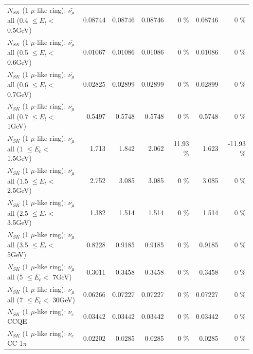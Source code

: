 \begin{table}
\begin{tabular}{| l | r | r | r  r | r  r |}
 $N_{SK}$ (1 $\mu$-like ring): $\bar{\nu_{\mu}}$ all (0.4 $\leq E_{t} <$ 0.5GeV) &         0.08744 &         0.08746 &         0.08746 &        0 \%  &         0.08746 &        0 \%  \\ 
 $N_{SK}$ (1 $\mu$-like ring): $\bar{\nu_{\mu}}$ all (0.5 $\leq E_{t} <$ 0.6GeV) &         0.01067 &         0.01086 &         0.01086 &        0 \%  &         0.01086 &        0 \%  \\ 
 $N_{SK}$ (1 $\mu$-like ring): $\bar{\nu_{\mu}}$ all (0.6 $\leq E_{t} <$ 0.7GeV) &         0.02825 &         0.02899 &         0.02899 &        0 \%  &         0.02899 &        0 \%  \\ 
   $N_{SK}$ (1 $\mu$-like ring): $\bar{\nu_{\mu}}$ all (0.7 $\leq E_{t} <$ 1GeV) &          0.5497 &          0.5748 &          0.5748 &        0 \%  &          0.5748 &        0 \%  \\ 
   $N_{SK}$ (1 $\mu$-like ring): $\bar{\nu_{\mu}}$ all (1 $\leq E_{t} <$ 1.5GeV) &           1.713 &           1.842 &           2.062 &    11.93 \%  &           1.623 &   -11.93 \%  \\ 
 $N_{SK}$ (1 $\mu$-like ring): $\bar{\nu_{\mu}}$ all (1.5 $\leq E_{t} <$ 2.5GeV) &           2.752 &           3.085 &           3.085 &        0 \%  &           3.085 &        0 \%  \\ 
 $N_{SK}$ (1 $\mu$-like ring): $\bar{\nu_{\mu}}$ all (2.5 $\leq E_{t} <$ 3.5GeV) &           1.382 &           1.514 &           1.514 &        0 \%  &           1.514 &        0 \%  \\ 
   $N_{SK}$ (1 $\mu$-like ring): $\bar{\nu_{\mu}}$ all (3.5 $\leq E_{t} <$ 5GeV) &          0.8228 &          0.9185 &          0.9185 &        0 \%  &          0.9185 &        0 \%  \\ 
     $N_{SK}$ (1 $\mu$-like ring): $\bar{\nu_{\mu}}$ all (5 $\leq E_{t} <$ 7GeV) &          0.3011 &          0.3458 &          0.3458 &        0 \%  &          0.3458 &        0 \%  \\ 
    $N_{SK}$ (1 $\mu$-like ring): $\bar{\nu_{\mu}}$ all (7 $\leq E_{t} <$ 30GeV) &         0.06266 &         0.07227 &         0.07227 &        0 \%  &         0.07227 &        0 \%  \\ 
\hline
\hline
\hline
                                      $N_{SK}$ (1 $\mu$-like ring): $\nu_e$ CCQE &         0.03442 &         0.03442 &         0.03442 &        0 \%  &         0.03442 &        0 \%  \\ 
                                 $N_{SK}$ (1 $\mu$-like ring): $\nu_e$ CC 1$\pi$ &         0.02202 &          0.0285 &          0.0285 &        0 \%  &          0.0285 &        0 \%  \\ 

\end{tabular}
\end{table}
